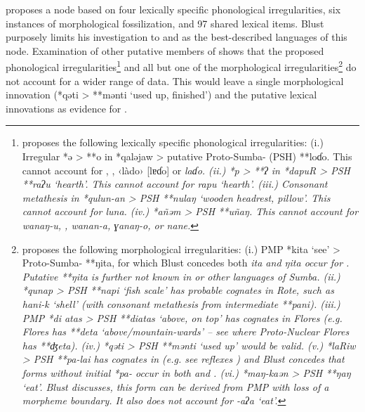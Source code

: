 \citet{Blust2008} proposes a  node based on four
lexically specific phonological irregularities,
six instances of morphological fossilization,
and 97 shared lexical items.
Blust purposely limits his investigation to 
and  as the best-described languages of this node.
Examination of other putative members of  shows
that the proposed phonological irregularities\footnote{
		\citet[90]{Blust2008}
		proposes the following lexically specific phonological irregularities:
		(i.) Irregular *ə > **o in *qaləjaw > putative Proto-Sumba- (PSH) **loɗo.
		This cannot account for ,
		,  ‹làdo› [lɐɗo] or  \it{laɗo}.
		(ii.) *p > **ʔ in *dapuR > PSH **raʔu ‘hearth’.
		This cannot account for  \it{rapu} ‘hearth’.
		(iii.) Consonant metathesis in *qulun-an > PSH **nulaŋ ‘wooden headrest, pillow’.
		This cannot account for  \it{luna}.
		(iv.) *añəm > PSH **uñaŋ.
		This cannot account for  \it{wanaŋ-u},
		,  \it{wanan-a},  \it{ɣanaŋ-o},
		or  \it{nane}.} 
and all but one of the morphological irregularities\footnote{
		\citet[91]{Blust2008}
		proposes the following morphological irregularities: (i.) PMP
		*kita ‘see’ > Proto-Sumba- **ŋita,
		for which Blust concedes both \it{ita}
		and \it{ŋita} occur for .
		Putative **ŋita is further not known in  or other languages of Sumba.
		(ii.) *qunap > PSH **napi ‘fish scale’ has probable cognates
		in Rote, such as  \it{hani-k} ‘shell’ (with consonant metathesis from intermediate **pani).
		(iii.) PMP *di atas > PSH **diatas ‘above,
		on top’ has cognates in Flores (e.g.
		 Flores has **deta ‘above/mountain-wards’ -- see 
		where Proto-Nuclear  Flores has **ʤeta).
		(iv.) *qəti > PSH **mənti ‘used up’ would be valid.
		(v.) *laRiw > PSH **pa-lai has cognates in  (e.g.
		see reflexes  )
		and Blust concedes that forms without initial *pa- occur in both  and .
		(vi.) *maŋ-kaən > PSH **ŋaŋ ‘eat’.
		 Blust discusses, this form can be derived from PMP with loss
		of a morpheme boundary.
		It also does not account for  \it{-aʔa} ‘eat’.}
		do not account
for a wider range of data.
This would leave a single morphological innovation (*qəti > **mənti
‘used up, finished’) and the putative lexical innovations as evidence for .
